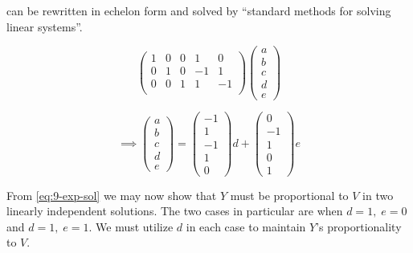 \documentclass[12pt]{article}
\begin{document}
   can be rewritten in echelon form and solved by ``standard
  methods for solving linear systems''.

  \begin{equation}
    \label{eq:9-matrix}
    \begin{pmatrix}
      1 & 0 & 0 & 1 & 0 \\
      0 & 1 & 0 & -1 & 1 \\
      0 & 0 & 1 & 1 & -1 \\
    \end{pmatrix}
    \begin{pmatrix}
      a \\ b \\ c \\ d \\ e
    \end{pmatrix}
  \end{equation}

  \begin{equation}
    \label{eq:9-exp-sol}
    \implies
    \begin{pmatrix}
      a \\ b \\ c \\ d \\ e
    \end{pmatrix}
    =
    \begin{pmatrix}
      -1 \\ 1 \\ -1 \\ 1 \\ 0
    \end{pmatrix}d +
    \begin{pmatrix}
      0 \\ -1 \\ 1 \\ 0 \\ 1
    \end{pmatrix}e
  \end{equation}

  From \cref{eq:9-exp-sol} we may now show that $Y$ must be proportional to $V$
  in two linearly independent solutions. The two cases in particular are when
  $d=1,\; e=0$ and $d=1,\; e=1$. We must utilize $d$ in each case to maintain $Y$'s
  proportionality to $V$.
\end{document}
